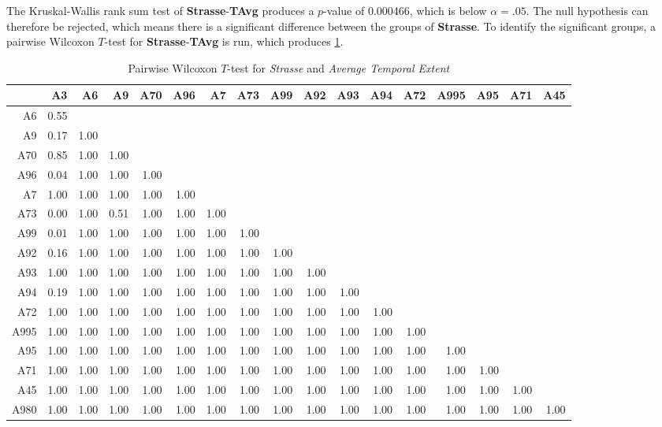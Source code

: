 The Kruskal-Wallis rank sum test of \textbf{Strasse}-\textbf{TAvg} produces a $p$-value of 0.000466, which is below $\alpha=.05$. The null hypothesis can therefore be rejected, which means there is a significant difference between the groups of \textbf{Strasse}. To identify the significant groups, a pairwise Wilcoxon $T$-test for \textbf{Strasse}-\textbf{TAvg} is run, which produces \cref{tbl:wilcoxon_baysis_matched_Strasse_TAvg}. 
\begin{table}[ht]
	\tiny
	\setlength{\tabcolsep}{4pt}
	\centering
	\begin{tabular}{rrrrrrrrrrrrrrrrr}
		\toprule
				& A3 & A6 & A9 & A70 & A96 & A7 & A73 & A99 & A92 & A93 & A94 & A72 & A995 & A95 & A71 & A45 \\ 
		\midrule
		A6 		& 0.55 &  &  &  &  &  &  &  &  &  &  &  &  &  &  &  \\ 
		A9 		& 0.17 & 1.00 &  &  &  &  &  &  &  &  &  &  &  &  &  &  \\ 
		A70		& 0.85 & 1.00 & 1.00 &  &  &  &  &  &  &  &  &  &  &  &  &  \\ 
		A96 	& 0.04 & 1.00 & 1.00 & 1.00 &  &  &  &  &  &  &  &  &  &  &  &  \\ 
		A7 		& 1.00 & 1.00 & 1.00 & 1.00 & 1.00 &  &  &  &  &  &  &  &  &  &  &  \\ 
		A73 	& 0.00 & 1.00 & 0.51 & 1.00 & 1.00 & 1.00 &  &  &  &  &  &  &  &  &  &  \\ 
		A99 	& 0.01 & 1.00 & 1.00 & 1.00 & 1.00 & 1.00 & 1.00 &  &  &  &  &  &  &  &  &  \\ 
		A92 	& 0.16 & 1.00 & 1.00 & 1.00 & 1.00 & 1.00 & 1.00 & 1.00 &  &  &  &  &  &  &  &  \\ 
		A93 	& 1.00 & 1.00 & 1.00 & 1.00 & 1.00 & 1.00 & 1.00 & 1.00 & 1.00 &  &  &  &  &  &  &  \\ 
		A94 	& 0.19 & 1.00 & 1.00 & 1.00 & 1.00 & 1.00 & 1.00 & 1.00 & 1.00 & 1.00 &  &  &  &  &  &  \\ 
		A72 	& 1.00 & 1.00 & 1.00 & 1.00 & 1.00 & 1.00 & 1.00 & 1.00 & 1.00 & 1.00 & 1.00 &  &  &  &  &  \\ 
		A995 	& 1.00 & 1.00 & 1.00 & 1.00 & 1.00 & 1.00 & 1.00 & 1.00 & 1.00 & 1.00 & 1.00 & 1.00 &  &  &  &  \\ 
		A95 	& 1.00 & 1.00 & 1.00 & 1.00 & 1.00 & 1.00 & 1.00 & 1.00 & 1.00 & 1.00 & 1.00 & 1.00 & 1.00 &  &  &  \\ 
		A71		& 1.00 & 1.00 & 1.00 & 1.00 & 1.00 & 1.00 & 1.00 & 1.00 & 1.00 & 1.00 & 1.00 & 1.00 & 1.00 & 1.00 &  &  \\ 
		A45 	& 1.00 & 1.00 & 1.00 & 1.00 & 1.00 & 1.00 & 1.00 & 1.00 & 1.00 & 1.00 & 1.00 & 1.00 & 1.00 & 1.00 & 1.00 &  \\ 
		A980 	& 1.00 & 1.00 & 1.00 & 1.00 & 1.00 & 1.00 & 1.00 & 1.00 & 1.00 & 1.00 & 1.00 & 1.00 & 1.00 & 1.00 & 1.00 & 1.00 \\
		\bottomrule
	\end{tabular}
	\caption{Pairwise Wilcoxon $T$-test for \textit{Strasse} and \textit{Average Temporal Extent}}
	\label{tbl:wilcoxon_baysis_matched_Strasse_TAvg}
\end{table}
